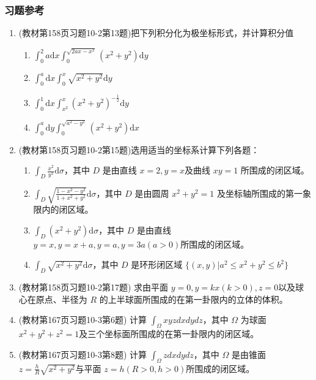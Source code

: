 \subsubsection{习题参考}
\begin{enumerate}
    \item (教材第158页习题10-2第13题)把下列积分化为极坐标形式，并计算积分值
        \begin{enumerate}[(1)]
            \item $\int _0 ^2a \mathrm{d} x \int _0^{\sqrt{2ax-x^2}} (x^2+y^2) \mathrm{d}y $
            \item $\int _0 ^a \mathrm{d} x \int _0^x \sqrt{x^2 + y^2} \mathrm{d}y$
            \item $\int _0^1 \mathrm{d} x \int _{x^2}^x (x^2 + y^2)^{-\frac{1}{2}} \mathrm{d}y  $
            \item $\int _0 ^a \mathrm{d}y \int _0 ^{\sqrt{a^2 -y^2}} (x^2 + y^2) \mathrm{d}x$
        \end{enumerate}

    \item (教材第158页习题10-2第15题)选用适当的坐标系计算下列各题：
        \begin{enumerate}[(1)]
            \item $\int _D \frac{x^2}{y^2} \mathrm{d}\sigma$，其中 $D$ 是由直线 $x=2,y=x$及曲线 $xy=1$ 所围成的闭区域。
            \item $\int _D \sqrt{\frac{1-x^2-y^2}{1+x^2+y^2}} \mathrm{d}\sigma$，其中 $D$ 是由圆周 $x^2+y^2=1$ 及坐标轴所围成的第一象限内的闭区域。
            \item $\int _D (x^2 + y^2) \mathrm{d} \sigma$，其中 $D$ 是由直线 $y=x, y=x+a, y=a, y=3a(a>0)$所围成的闭区域。
            \item $\int _D \sqrt{x^2 +y^2} \mathrm{d} \sigma$，其中 $D$ 是环形闭区域 $\{ (x,y) | a^2 \le x^2 + y^2 \le b^2\}$
        \end{enumerate}

    \item (教材第158页习题10-2第17题) 求由平面 $y=0,y=kx(k>0),z=0$以及球心在原点、半径为 $R$ 的上半球面所围成的在第一卦限内的立体的体积。

    \item (教材第167页习题10-3第6题) 计算 $\int _\Omega xyz dx dy dz$，其中 $\Omega$ 为球面 $x^2 + y^2 +z^2 =1$及三个坐标面所围成的在第一卦限内的闭区域。

    \item (教材第167页习题10-3第8题) 计算 $\int _\Omega z dx dy dz$，其中 $\Omega$ 是由锥面 $z = \frac{h}{R} \sqrt{x^2 + y^2}$与平面 $z=h (R>0, h>0)$所围成的闭区域。


\end{enumerate}

